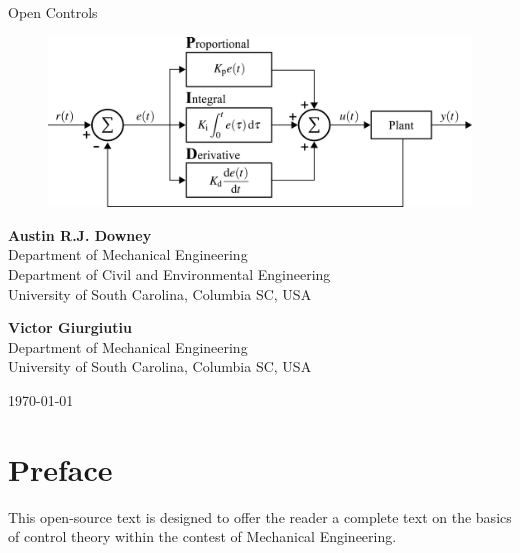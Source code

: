 \documentclass[12pt,letter]{article}
\numberwithin{ex}{section} %
\numberwithin{re}{section} %
\numberwithin{equation}{section}	%
\begin{document}
\begin{center}
	{\fontsize{50}{60}\selectfont Open Controls}
	
	\vspace{3cm}
	
	\begin{figure}[H]
		\includegraphics[width=6.5in]{figures/PID_controller.png}
		\label{fig:title_figure}
	\end{figure} 
	
	\vspace{3cm}
	
	\textbf{Austin R.J. Downey}\\ Department of Mechanical Engineering \\ Department of Civil and Environmental Engineering \\ University of South Carolina, Columbia SC, USA 
	
	\vspace{1.5cm}
	
	\textbf{Victor Giurgiutiu}\\  Department of Mechanical Engineering \\ University of South Carolina, Columbia SC, USA 
	
	\vspace{1cm}
	
	\today
\end{center}

\pagebreak

\section*{Preface}

This open-source text is designed to offer the reader a complete text on the basics of control theory within the contest of Mechanical Engineering. 
\end{document}
